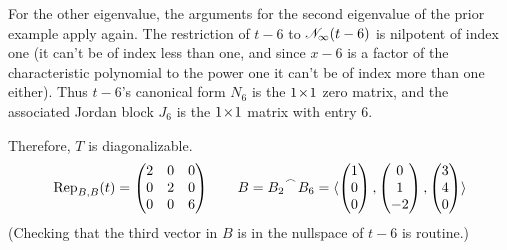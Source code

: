 \begin{example}
For the other eigenvalue, the arguments for the second eigenvalue of
the prior example apply again.
The restriction of $t-6$ to $\mathscr{N}_\infty(t-6)$ is nilpotent of 
index one (it can't be of index less than one, and since $x-6$ is a 
factor of the characteristic polynomial to the power one it can't
be of index more than one either). 
Thus $t-6$'s canonical form $N_6$ is the $1 \! \times \! 1$ zero matrix,
and the associated Jordan block $J_6$ is the $1 \! \times \! 1$ matrix with entry $6$.
 
Therefore, \( T \) is diagonalizable.
\begin{equation*}
  \rep{t}{B,B}=
  \begin{pmatrix}
    2  &0  &0  \\
    0  &2  &0  \\
    0  &0  &6
  \end{pmatrix}
  \qquad
  B=\cat{B_2}{B_6}
   =\sequence{\colvec{1 \\ 0 \\ 0},
              \colvec{0 \\ 1 \\ -2},
              \colvec{3 \\ 4 \\ 0}}
\end{equation*}
(Checking that the third vector in $B$ is in the nullspace of $t-6$ is
routine.)
\end{example}

